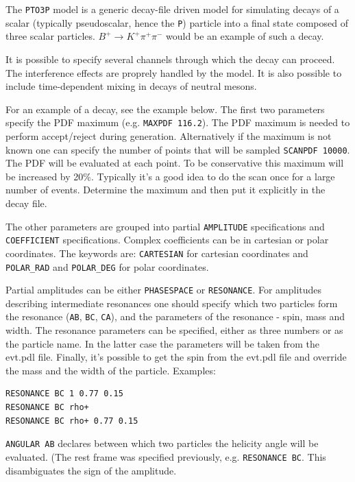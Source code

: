 \label{pto3p}

The \texttt{PTO3P} model is a generic decay-file driven model for simulating 
decays of a scalar (typically pseudoscalar, hence the \texttt{P}) particle
into a final state composed of three scalar particles. $B^+\to K^+\pi^+\pi^-$
would be an example of such a decay. 

It is possible to specify several channels through which the decay can proceed.
The interference effects are proprely handled by the model. It is also possible
to include time-dependent mixing in decays of neutral mesons.

\Expl
For an example of a decay, see the example below.
The first two parameters specify the PDF maximum (e.g. \texttt{MAXPDF 116.2}).
The PDF maximum is needed to perform accept/reject during generation. 
Alternatively if the maximum is not known one can specify the number of points
that will be sampled \texttt{SCANPDF 10000}. The PDF will be evaluated at each
point. To be conservative this maximum will be increased by 20\%. Typically
it's a good idea to do the scan once for a large number of events. Determine
the maximum and then put it explicitly in the decay file.

The other parameters are grouped into partial \texttt{AMPLITUDE} specifications and 
\texttt{COEFFICIENT} specifications. Complex coefficients can be in cartesian 
or polar coordinates. The keywords are: \texttt{CARTESIAN} for 
cartesian coordinates and \texttt{POLAR\_RAD} and \texttt{POLAR\_DEG} for polar coordinates.   

Partial amplitudes can be either \texttt{PHASESPACE} or \texttt{RESONANCE}.
For amplitudes describing intermediate resonances one should specify which 
two particles form the resonance (\texttt{AB}, \texttt{BC}, \texttt{CA}),
and the parameters of the resonance - spin, mass and width. The resonance parameters 
can be specified, either as three numbers or as the particle name. In the latter case
the parameters will be taken from the evt.pdl file. Finally, it's possible to 
get the spin from the evt.pdl file and override the mass and the width of the particle.
Examples:

\begin{verbatim}
RESONANCE BC 1 0.77 0.15
RESONANCE BC rho+
RESONANCE BC rho+ 0.77 0.15
\end{verbatim}
    
\texttt{ANGULAR AB} declares between which two particles the helicity angle will be evaluated.
(The rest frame was specified previously, e.g. \texttt{RESONANCE BC}. This disambiguates
the sign of the amplitude.

